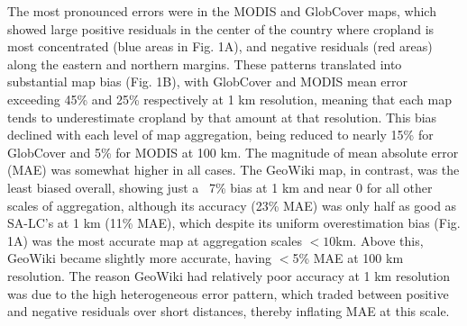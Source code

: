 \documentclass[a4paper]{article}
\begin{document}
The most pronounced errors were in the MODIS and GlobCover maps, which showed large positive residuals in the center of the country where cropland is most concentrated (blue areas in Fig. 1A), and negative residuals (red areas) along the eastern and northern margins.
These patterns translated into substantial map bias (Fig. 1B), with GlobCover and MODIS mean error exceeding 45\% and 25\% respectively at 1 km resolution, meaning that each map tends to underestimate cropland by that amount at that resolution. This bias declined with each level of map aggregation, being reduced to nearly 15\% for GlobCover and 5\% for MODIS at 100 km. The magnitude of mean absolute error (MAE) was somewhat higher in all cases. The GeoWiki map, in contrast, was the least biased overall, showing just a ~7\% bias at 1 km and near 0 for all other scales of aggregation, although its accuracy (23\% MAE) was only half as good as SA-LC's at 1 km (11\% MAE), which despite its uniform overestimation bias (Fig. 1A) was the most accurate map at aggregation scales $<10$km. Above this, GeoWiki became slightly more accurate, having $<$5\% MAE at 100 km resolution. The reason GeoWiki had relatively poor accuracy at 1 km resolution was due to the high heterogeneous error pattern, which traded between positive and negative residuals over short distances, thereby inflating MAE at this scale.  
\end{document}
